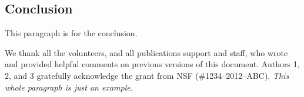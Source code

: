 \documentclass[sigchi, review]{acmart}
\begin{document}
\begin{CJK*}{UTF8}{gbsn}


\maketitle













\section{Conclusion}

This paragraph is for the conclusion.

\begin{acks}

We thank all the volunteers, and all publications support and staff, who wrote and provided helpful comments on previous versions of this document. Authors 1, 2, and 3 gratefully acknowledge the grant from NSF (\#1234--2012--ABC). \textit{This whole paragraph is just an example.}

\end{acks}




\end{CJK*}
\end{document}
